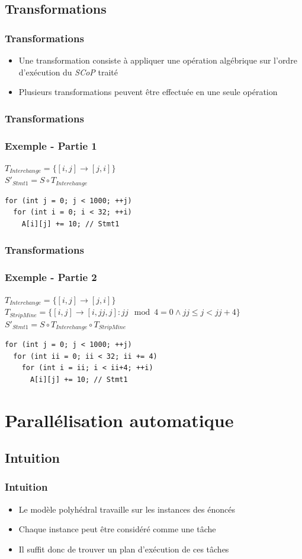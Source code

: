 \documentclass{beamer}
\begin{document}
\subsection{Transformations}
\begin{frame}
\frametitle{Transformations}
\begin{itemize}
\item Une transformation consiste à appliquer une opération algébrique sur l'ordre d'exécution du \textit{SCoP} traité
\item Plusieurs transformations peuvent être effectuée en une seule opération
\end{itemize}
\end{frame}

\begin{frame}[fragile]
\frametitle{Transformations}
\frametitle{Exemple - Partie 1}
$T_{Interchange} = \{[i,j] \rightarrow [j,i] \}$\\
\vspace{0.5cm}
$S'_{Stmt1} = S \circ T_{Interchange}$\\
\vspace{0.5cm}
\begin{lstlisting}
for (int j = 0; j < 1000; ++j)
  for (int i = 0; i < 32; ++i)
    A[i][j] += 10; // Stmt1
\end{lstlisting}
\end{frame}

\begin{frame}[fragile]
\frametitle{Transformations}
\frametitle{Exemple - Partie 2}
$T_{Interchange} = \{[i,j] \rightarrow [j,i] \}$\\
$T_{StripMine} = \{[i,j] \rightarrow [i,jj,j]: jj \mod 4 = 0 \wedge jj \leq j < jj + 4 \}$\\
\vspace{0.5cm}
$S'_{Stmt1} = S \circ T_{Interchange} \circ T_{StripMine}$\\
\vspace{0.5cm}
\begin{lstlisting}
for (int j = 0; j < 1000; ++j)
  for (int ii = 0; ii < 32; ii += 4)
    for (int i = ii; i < ii+4; ++i)
      A[i][j] += 10; // Stmt1
\end{lstlisting}
\end{frame}

\section{Parallélisation automatique}
\subsection{Intuition}
\begin{frame}
\frametitle{Intuition}
\begin{itemize}
\item Le modèle polyhédral travaille sur les instances des énoncés
\item<2-> Chaque instance peut être considéré comme une tâche
\item<3-> Il suffit donc de trouver un plan d'exécution de ces tâches
\end{itemize}
\end{frame}
\end{document}
